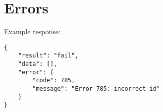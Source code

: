 \newpage
\section{Errors}


Example response:  \\
\begin{Verbatim}[frame=single]
{
    "result": "fail",
    "data": [],
    "error": {
        "code": 785,
        "message": "Error 785: incorrect id"
    }
}
\end{Verbatim}